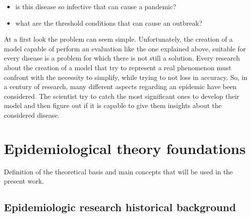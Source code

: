 \begin{itemize}
	\item is this disease so infective that can cause a pandemic?
	\item what are the threshold conditions that can cause an outbreak? 
\end{itemize}


At a first look the problem can seem simple. Unfortunately, the creation of a model capable of perform an evaluation like the one explained above, suitable for every disease is a problem for which there is not still a solution. 
Every research about the creation of a model that try to represent a real phenomenon must confront with the necessity to simplify, while trying to not loss in accuracy. 
So, in a century of research, many different aspects regarding an epidemic have been considered. The scientist try to catch the most significant ones to develop their model and then figure out if it is capable to give them insights about the considered disease. 




\section{Epidemiological theory foundations}

Definition of the theoretical basis and main concepts that will be used in the present work. 
\subsection{ Epidemiologic research historical background}


